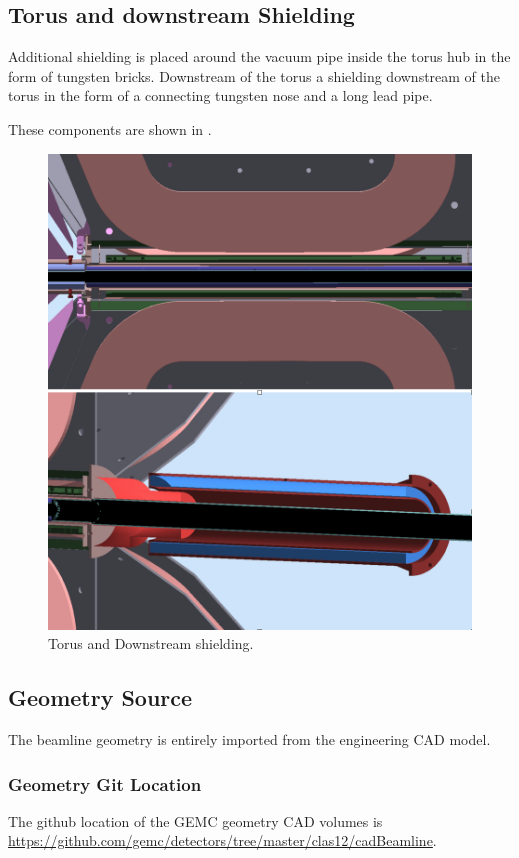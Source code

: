 \subsection{Torus and downstream Shielding}
Additional shielding is placed around the vacuum pipe inside the torus hub in the form of tungsten bricks.
Downstream of the torus a shielding downstream of the torus in the form of a connecting tungsten nose and a long lead pipe.

These components are shown in .

\begin{figure}
	\centering
	\includegraphics[width=0.98\columnwidth,keepaspectratio]{img/downstreamShielding.png}
   \caption{Torus and Downstream shielding.}
	\label{fig:downstreamShielding}
\end{figure}



\subsection{Geometry Source}

The beamline geometry is entirely imported from the engineering CAD model.

\subsubsection{Geometry Git Location}

The github location of the GEMC geometry CAD volumes is \url{https://github.com/gemc/detectors/tree/master/clas12/cadBeamline}.

